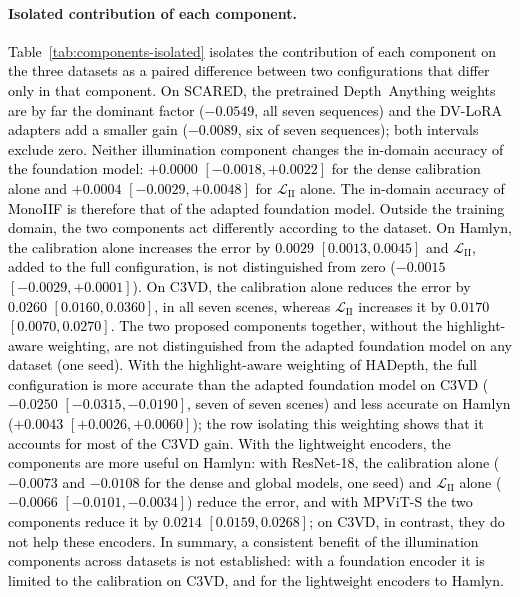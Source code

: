 \documentclass[a4paper,fleqn]{cas-dc}
\begin{document}
{{\paragraph{Isolated contribution of each component.}
\textcolor{black}{Table~\ref{tab:components-isolated} isolates the contribution of each component on the three datasets as a paired difference between two configurations that differ only in that component. On SCARED, the pretrained Depth~Anything weights are by far the dominant factor ($-0.0549$, all seven sequences) and the DV-LoRA adapters add a smaller gain ($-0.0089$, six of seven sequences); both intervals exclude zero. Neither illumination component changes the in-domain accuracy of the foundation model: $+0.0000$ $[-0.0018, +0.0022]$ for the dense calibration alone and $+0.0004$ $[-0.0029, +0.0048]$ for $\mathcal{L}_\textrm{II}$ alone. The in-domain accuracy of MonoIIF is therefore that of the adapted foundation model. Outside the training domain, the two components act differently according to the dataset. On Hamlyn, the calibration alone increases the error by $0.0029$ $[0.0013, 0.0045]$ and $\mathcal{L}_\textrm{II}$, added to the full configuration, is not distinguished from zero ($-0.0015$ $[-0.0029, +0.0001]$). On C3VD, the calibration alone reduces the error by $0.0260$ $[0.0160, 0.0360]$, in all seven scenes, whereas $\mathcal{L}_\textrm{II}$ increases it by $0.0170$ $[0.0070, 0.0270]$. The two proposed components together, without the highlight-aware weighting, are not distinguished from the adapted foundation model on any dataset (one seed). With the highlight-aware weighting of HADepth, the full configuration is more accurate than the adapted foundation model on C3VD ($-0.0250$ $[-0.0315, -0.0190]$, seven of seven scenes) and less accurate on Hamlyn ($+0.0043$ $[+0.0026, +0.0060]$); the row isolating this weighting shows that it accounts for most of the C3VD gain. With the lightweight encoders, the components are more useful on Hamlyn: with ResNet-18, the calibration alone ($-0.0073$ and $-0.0108$ for the dense and global models, one seed) and $\mathcal{L}_\textrm{II}$ alone ($-0.0066$ $[-0.0101, -0.0034]$) reduce the error, and with MPViT-S the two components reduce it by $0.0214$ $[0.0159, 0.0268]$; on C3VD, in contrast, they do not help these encoders. In summary, a consistent benefit of the illumination components across datasets is not established: with a foundation encoder it is limited to the calibration on C3VD, and for the lightweight encoders to Hamlyn.}}
%
\begin{figure}[]
    \centering

\end{figure}}
\end{document}
